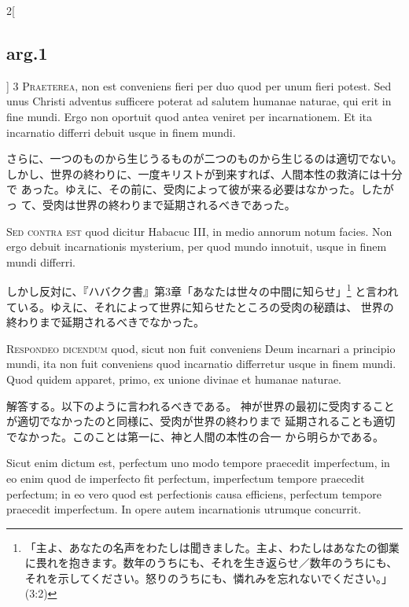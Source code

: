 \documentclass[paper=a4paper,fontsize=10pt,jafontsize=9pt,titlepage]{jlreq}
\begin{document}
\begin{paracol}{2}[\subsection{arg.1}]
{\scshape 3 Praeterea}, non est conveniens fieri per
duo quod per unum fieri potest. Sed unus Christi adventus sufficere
poterat ad salutem humanae naturae, qui erit in fine mundi. Ergo non
oportuit quod antea veniret per incarnationem. Et ita incarnatio
differri debuit usque in finem mundi.

\switchcolumn

さらに、一つのものから生じうるものが二つのものから生じるのは適切でない。
しかし、世界の終わりに、一度キリストが到来すれば、人間本性の救済には十分で
 あった。ゆえに、その前に、受肉によって彼が来る必要はなかった。したがっ
 て、受肉は世界の終わりまで延期されるべきであった。

\switchcolumn*[\subsection{s.c.}]

{\scshape Sed contra est} quod dicitur Habacuc III, in
medio annorum notum facies. Non ergo debuit incarnationis mysterium, per
quod mundo innotuit, usque in finem mundi differri.

\switchcolumn

しかし反対に、『ハバクク書』第3章「あなたは世々の中間に知らせ」\footnote{「主よ、あなたの名声をわたしは聞きました。主よ、わたしはあなたの御業に畏れを抱きます。数年のうちにも、それを生き返らせ／数年のうちにも、それを示してください。怒りのうちにも、憐れみを忘れないでください。」(3:2)}
と言われている。ゆえに、それによって世界に知らせたところの受肉の秘蹟は、
 世界の終わりまで延期されるべきでなかった。


{\scshape Respondeo dicendum} quod, sicut non fuit
conveniens Deum incarnari a principio mundi, ita non fuit conveniens
quod incarnatio differretur usque in finem mundi. Quod quidem apparet,
primo, ex unione divinae et humanae naturae.

\switchcolumn

解答する。以下のように言われるべきである。
神が世界の最初に受肉することが適切でなかったのと同様に、受肉が世界の終わりまで
 延期されることも適切でなかった。このことは第一に、神と人間の本性の合一
 から明らかである。

\switchcolumn*

Sicut enim dictum est,
perfectum uno modo tempore praecedit imperfectum, in eo enim quod de
imperfecto fit perfectum, imperfectum tempore praecedit perfectum; in eo
vero quod est perfectionis causa efficiens, perfectum tempore praecedit
imperfectum. In opere autem incarnationis utrumque concurrit.


\end{paracol}
\end{document}
